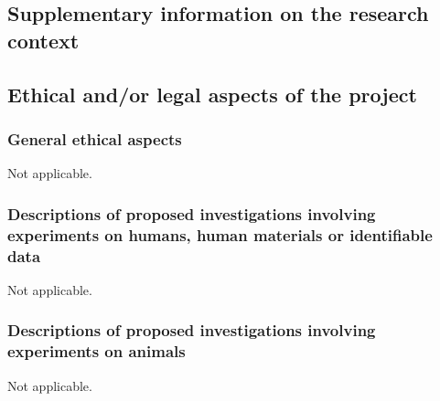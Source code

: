 \documentclass[a4paper,11pt,headings=normal]{scrartcl}
\begin{document}
\begin{itemize}
\setcounter{page}{1}


\section{Supplementary information on the research context}
\subsection{Ethical and/or legal aspects of the project}
\subsubsection{General ethical aspects}
Not applicable.

\subsubsection{Descriptions of proposed investigations involving experiments on 
humans, human materials or identifiable data}
Not applicable.

\subsubsection{Descriptions of proposed investigations involving experiments on 
animals}
Not applicable.


\end{itemize}
\end{document}
